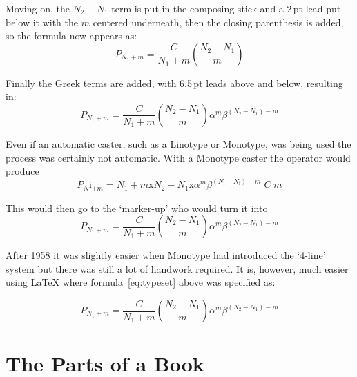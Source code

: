 \documentclass[10pt,letterpaper,extrafontsizes]{memoir}
\newcommand\U[2]{\textrm{#1}\,\textrm{#2}}
\begin{document}
   Moving on, the $N_{2}-N_{1}$ term is put in the composing stick and a \U{2}{pt}
lead put below it with the $m$ centered underneath, then the closing parenthesis
is added, so the formula now appears as:
\begin{displaymath}
P_{N_1 + m} = \frac{C}{N_{1} + m} \binom{N_{2} - N_{1}}{m}
\end{displaymath}
 
    Finally the Greek terms are added, with \U{6.5}{pt} leads above and below, 
resulting in:
\begin{displaymath}
P_{N_1 + m} = \frac{C}{N_{1} + m} \binom{N_{2} - N_{1}}{m}
              \alpha^{m}\beta^{(N_{2}-N_{1}) - m}
\end{displaymath}

    Even if an automatic caster, such as a Linotype or Monotype, was being 
used the process was certainly not automatic. With a 
Monotype caster the 
operator would produce
\providecommand*{\tmri}{\mathrm{i}}
\providecommand*{\tmrx}{\mathrm{x}}
\begin{displaymath}
P_{N}\tmri_{+m} = N_{1} + m\tmrx N_{2}-N_{1}\tmrx \alpha^{m}\beta^{(N_{\tmri}-N_{\tmri}) - m} \; C \; m
\end{displaymath}

This would then go to the `marker-up' who would turn it into
\begin{displaymath}
P_{N_1 + m} = \frac{C}{N_{1} + m} \binom{N_{2} - N_{1}}{m}
              \alpha^{m}\beta^{(N_{2}-N_{1}) - m}
\end{displaymath}

After 1958 it was slightly easier when Monotype had introduced the 
`4-line' system but there was still a lot of handwork required. 
It is, however, much easier using LaTeX where 
formula~\ref{eq:typeset} above was specified as:
\begin{lcode}
\begin{equation}
P_{N_1 + m} = \frac{C}{N_{1} + m} \binom{N_{2} - N_{1}}{m}
              \alpha^{m}\beta^{(N_{2}-N_{1}) - m}
\end{equation}
\end{lcode}





\chapter{The Parts of a Book}
\end{document}
